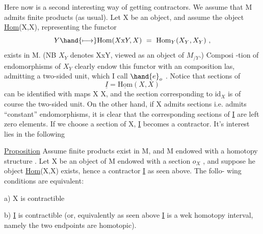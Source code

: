 Here now is a second interesting way of getting contractors.  We
assume that M admits finite products (as usual).  Let X be an object,  and
assume the object \uline{Hom}(X,X),  representing the functor
\[ Y \hand{\ensuremath{\longmapsto}} \mathrm{Hom}(X\mathrm{x}Y,X) \ = \ \mathrm{Hom}_{Y}(X_{Y},X_{Y}) \text{ ,} \]
exists in M.  (NB  $X_{Y}$  denotes XxY, viewed as an object of $M_{/Y}$.)  Composi%
-tion of endomorphisms of $X_{Y}$ clearly endow this functor with an  composition
las,  admitting a two-sided unit, which I call $\hand{\ensuremath{e}}_{o}$ .   Notice that
sections of 
\[ \underline{I} = \underline{\mathrm{Hom}}(X,X) \]
can be identified with maps X \hand{$\rightarrow$} X,  and the section corresponding to id$_{X}$
is of course the two-sided unit.  On the other hand,  if X admits sections
i.e. admits ``constant'' endomorphisms,  it is clear that the corresponding
sections of \underline{I} are  left zero elements.  If we choose  a section\xout{\unsure{,}}
of X,  \underline{I}  becomes a contractor.  It's interest lies in the following

\uline{Proposition}  Assume  finite products exist in M,  and M endowed with
a homotopy structure  .
 Let X be an object of M endowed with a section $o_{X}$ ,  and suppose he
object \uline{Hom}(X,X) exists,  hence a contractor \underline{I} as seen above.  The follo-%
wing  conditions are equivalent:

a)  X is contractible

b)  \underline{I} is contractible (or,  equivalently as seen above\hand{,} \underline{I} is a wek
homotopy interval, namely the two endpoints are homotopic).

